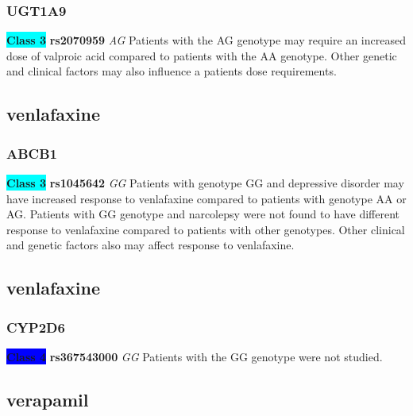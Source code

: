 \documentclass{book}
\begin{document}
\subsubsection{ UGT1A9 }

\begin{center}
\textbf{\colorbox{cyan} {Class 3}} \textbf{ rs2070959 } \textit{ AG }
Patients with the AG genotype may require an increased dose of valproic acid compared to patients with the AA genotype. Other genetic and clinical factors may also influence a patients dose requirements.


\end{center}\subsection{ venlafaxine }


\subsubsection{ ABCB1 }

\begin{center}
\textbf{\colorbox{cyan} {Class 3}} \textbf{ rs1045642 } \textit{ GG }
Patients with genotype GG and depressive disorder may have increased response to venlafaxine compared to patients with genotype AA or AG. Patients with GG genotype and narcolepsy were not found to have different response to venlafaxine compared to patients with other genotypes. Other clinical and genetic factors also may affect response to venlafaxine.


\end{center}\subsection{ venlafaxine }


\subsubsection{ CYP2D6 }

\begin{center}

\textbf{\colorbox{blue} {Class 4}} \textbf{ rs367543000 } \textit{ GG }
Patients with the GG genotype were not studied.

\end{center}\subsection{ verapamil }
\end{document}
